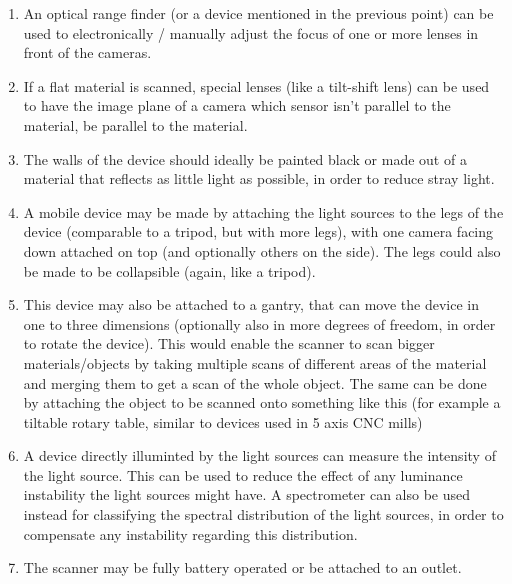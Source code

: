 \documentclass[11pt, twoside, listof=totocnumbered, bibliography=totocnumbered]{scrartcl}
\newcommand{\br}{\hfill\\}
\begin{document}
\begin{enumerate}
	\item An optical range finder (or a device mentioned in the previous point) can be used to electronically / manually adjust the focus of one or more lenses in front of the cameras.
	\item If a flat material is scanned, special lenses (like a tilt-shift lens) can be used to have the image plane of a camera which sensor isn't parallel to the material, be parallel to the material.
	\item The walls of the device should ideally be painted black or made out of a material that reflects as little light as possible, in order to reduce stray light.
	\item A mobile device may be made by attaching the light sources to the legs of the device (comparable to a tripod, but with more legs), with one camera facing down attached on top (and optionally others on the side). The legs could also be made to be collapsible (again, like a tripod).
	\item This device may also be attached to a gantry, that can move the device in one to three dimensions (optionally also in more degrees of freedom, in order to rotate the device). This would enable the scanner to scan bigger materials/objects by taking multiple scans of different areas of the material and merging them to get a scan of the whole object. The same can be done by attaching the object to be scanned onto something like this (for example a tiltable rotary table, similar to devices used in 5 axis CNC mills)	
	\item A device directly illuminted by the light sources can measure the intensity of the light source. This can be used to reduce the effect of any luminance instability the light sources might have. A spectrometer can also be used instead for classifying the spectral distribution of the light sources, in order to compensate any instability regarding this distribution.
	\item The scanner may be fully battery operated or be attached to an outlet.
\end{enumerate}\br
\end{document}
